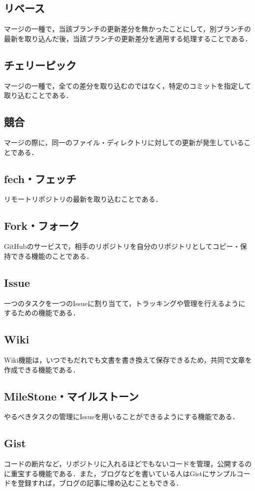 \subsection{リベース}
マージの一種で，当該ブランチの更新差分を無かったことにして，別ブランチの最新を取り込んだ後，当該ブランチの更新差分を適用する処理することである．

\subsection{チェリーピック}
マージの一種で，全ての差分を取り込むのではなく，特定のコミットを指定して取り込むことである．

\subsection{競合}
マージの際に，同一のファイル・ディレクトリに対しての更新が発生していることである．

\subsection{fech・フェッチ}
リモートリポジトリの最新を取り込むことである．

\subsection{Fork・フォーク}
GitHubのサービスで，相手のリポジトリを自分のリポジトリとしてコピー・保持できる機能のことである．

\newpage

\subsection{Issue}
一つのタスクを一つのIssueに割り当てて，トラッキングや管理を行えるようにするための機能である．

\subsection{Wiki}
Wiki機能は，いつでもだれでも文書を書き換えて保存できるため，共同で文章を作成できる機能である．

\subsection{MileStone・マイルストーン}
やるべきタスクの管理にIssueを用いることができるようにする機能である．

\subsection{Gist}
コードの断片など，リポジトリに入れるほどでもないコードを管理，公開するのに重宝する機能である．また，ブログなどを書いている人はGistにサンプルコードを登録すれば，ブログの記事に埋め込むこともできる．

